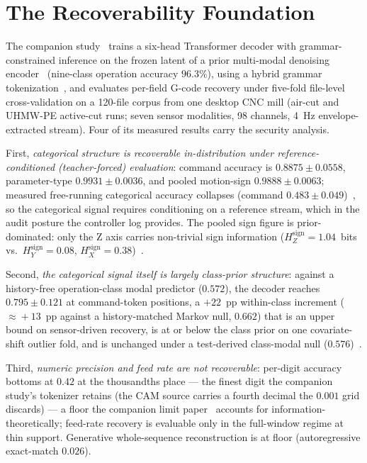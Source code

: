 \documentclass[sensors,article,submit,moreauthors,pdftex]{Definitions/mdpi}
\begin{document}
\section{The Recoverability Foundation}
\label{sec:foundation}

The companion study~\cite{decoder_paper} trains a six-head Transformer decoder with grammar-constrained inference on the frozen latent of a prior multi-modal denoising encoder~\cite{encoder_paper} (nine-class operation accuracy $96.3\%$), using a hybrid grammar tokenization~\cite{grammar_paper}, and evaluates per-field G-code recovery under five-fold file-level cross-validation on a 120-file corpus from one desktop CNC mill (air-cut and UHMW-PE active-cut runs; seven sensor modalities, 98 channels, 4~Hz envelope-extracted stream). Four of its measured results carry the security analysis.

First, \emph{categorical structure is recoverable in-distribution under reference-conditioned (teacher-forced) evaluation}: command accuracy is $0.8875 \pm 0.0558$, parameter-type $0.9931 \pm 0.0036$, and pooled motion-sign $0.9888 \pm 0.0063$; measured free-running categorical accuracy collapses (command $0.483 \pm 0.049$)~\cite{decoder_paper}, so the categorical signal requires conditioning on a reference stream, which in the audit posture the controller log provides. The pooled sign figure is prior-dominated: only the Z axis carries non-trivial sign information ($H_{Z}^{\text{sign}}\!=\!1.04$~bits vs.\ $H_{Y}^{\text{sign}}\!=\!0.08$, $H_{X}^{\text{sign}}\!=\!0.38$)~\cite{paperB_entropy}.

Second, \emph{the categorical signal itself is largely class-prior structure}: against a history-free operation-class modal predictor ($0.572$), the decoder reaches $0.795 \pm 0.121$ at command-token positions, a $+22$~pp within-class increment ($\approx\!+13$~pp against a history-matched Markov null, $0.662$) that is an upper bound on sensor-driven recovery, is at or below the class prior on one covariate-shift outlier fold, and is unchanged under a test-derived class-modal null ($0.576$)~\cite{decoder_paper}.

Third, \emph{numeric precision and feed rate are not recoverable}: per-digit accuracy bottoms at $0.42$ at the thousandths place --- the finest digit the companion study's tokenizer retains (the CAM source carries a fourth decimal the $0.001$ grid discards) --- a floor the companion limit paper~\cite{paperB_entropy} accounts for information-theoretically; feed-rate recovery is evaluable only in the full-window regime at thin support. Generative whole-sequence reconstruction is at floor (autoregressive exact-match $0.026$).
\end{document}
